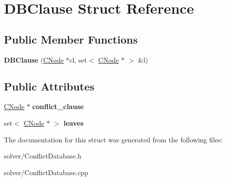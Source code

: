 \hypertarget{structDBClause}{\section{\-D\-B\-Clause \-Struct \-Reference}
\label{structDBClause}
}
\subsection*{\-Public \-Member \-Functions}
\begin{DoxyCompactItemize}
\item 
\hypertarget{structDBClause_a83e0b7a5199569bb185463a536c80cbb}{{\bfseries \-D\-B\-Clause} (\hyperlink{classCNode}{\-C\-Node} $\ast$cl, set$<$ \hyperlink{classCNode}{\-C\-Node} $\ast$ $>$ \&l)}\label{structDBClause_a83e0b7a5199569bb185463a536c80cbb}

\end{DoxyCompactItemize}
\subsection*{\-Public \-Attributes}
\begin{DoxyCompactItemize}
\item 
\hypertarget{structDBClause_a2a5c384bc43691a6328110bfb5b7b98b}{\hyperlink{classCNode}{\-C\-Node} $\ast$ {\bfseries conflict\-\_\-clause}}\label{structDBClause_a2a5c384bc43691a6328110bfb5b7b98b}

\item 
\hypertarget{structDBClause_ac53163d7fd083c41b9eb7f89d5b256dc}{set$<$ \hyperlink{classCNode}{\-C\-Node} $\ast$ $>$ {\bfseries leaves}}\label{structDBClause_ac53163d7fd083c41b9eb7f89d5b256dc}

\end{DoxyCompactItemize}


\-The documentation for this struct was generated from the following files\-:\begin{DoxyCompactItemize}
\item 
solver/\-Conflict\-Database.\-h\item 
solver/\-Conflict\-Database.\-cpp\end{DoxyCompactItemize}
